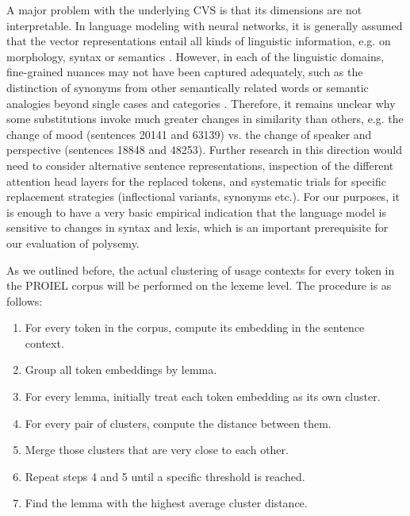 \documentclass[runningheads]{llncs}
\begin{document}
A major problem with the underlying \gls{CVS} is that its dimensions are not interpretable. In language modeling with neural networks, it is generally assumed that the vector representations entail all kinds of linguistic information, e.g. on morphology, syntax or semantics \parencites[8]{gladkovaAnalogybasedDetectionMorphological2016}[143]{rogersTooManyProblems2017}. However, in each of the linguistic domains, fine-grained nuances may not have been captured adequately, such as the distinction of synonyms from other semantically related words \parencite[115]{karanDistributionalSemanticsApproach2012} or semantic analogies beyond single cases and categories \parencite[142f.]{rogersTooManyProblems2017}. Therefore, it remains unclear why some substitutions invoke much greater changes in similarity than others, e.g. the change of mood (sentences 20141 and 63139) vs. the change of speaker and perspective (sentences 18848 and 48253). Further research in this direction would need to consider alternative sentence representations, inspection of the different attention head layers for the replaced tokens, and systematic trials for specific replacement strategies (inflectional variants, synonyms etc.). For our purposes, it is enough to have a very basic empirical indication that the language model is sensitive to changes in syntax and lexis, which is an important prerequisite for our evaluation of polysemy.

As we outlined before, the actual clustering of usage contexts for every token in the PROIEL corpus will be performed on the lexeme level. The procedure is as follows:
\begin{enumerate}
	\item For every token in the corpus, compute its embedding in the sentence context.
	\item Group all token embeddings by lemma.
	\item For every lemma, initially treat each token embedding as its own cluster.
	\item For every pair of clusters, compute the distance between them.
	\item Merge those clusters that are very close to each other.
	\item Repeat steps 4 and 5 until a specific threshold is reached.
	\item Find the lemma with the highest average cluster distance.
\end{enumerate}
\end{document}
